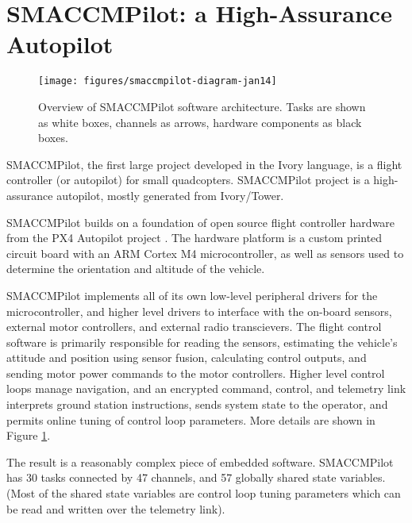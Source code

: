 \section{SMACCMPilot: a High-Assurance Autopilot}
\label{sec:smaccmpilot}

\begin{figure}
  \begin{center}
\texttt{[image: figures/smaccmpilot-diagram-jan14]}
  \end{center}
\caption[SMACCMPilot software architecture]{Overview of SMACCMPilot
software architecture. Tasks are shown as white boxes, channels as arrows,
hardware components as black boxes.}
\label{fig:smaccmpilotSwArch}
\end{figure}


SMACCMPilot, the first large project
developed in the Ivory language, is a flight controller (or autopilot) for small
quadcopters. SMACCMPilot project is a high-assurance autopilot, mostly generated
from Ivory/Tower.

SMACCMPilot builds on a foundation of open source flight controller hardware
from the PX4 Autopilot project . The hardware platform is a
custom printed circuit board with an ARM Cortex M4 microcontroller, as well as
sensors used to determine the orientation and altitude of the vehicle.

SMACCMPilot implements all of its own low-level peripheral drivers for the
microcontroller, and higher level drivers to interface with the on-board
sensors, external motor controllers, and external radio transcievers. The flight
control software is primarily responsible for reading the sensors, estimating
the vehicle's attitude and position using sensor fusion, calculating control
outputs, and sending motor power commands to the motor controllers.  Higher
level control loops manage navigation, and an encrypted command, control, and
telemetry link interprets ground station instructions, sends system state to the
operator, and permits online tuning of control loop parameters. More details are
shown in Figure \ref{fig:smaccmpilotSwArch}.

The result is a reasonably complex piece of embedded software.  SMACCMPilot has
30 tasks connected by 47 channels, and 57 globally shared state variables. (Most
of the shared state variables are control loop tuning parameters which can be
read and written over the telemetry link).

